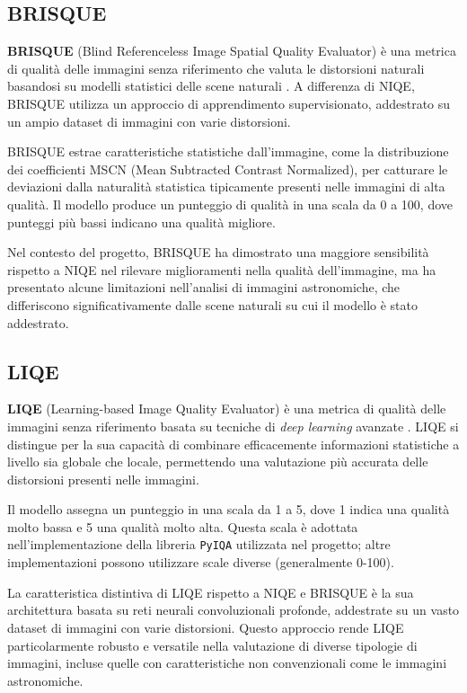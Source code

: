 \subsection{BRISQUE} \label{subsec:brisque}

\textbf{BRISQUE} (Blind Referenceless Image Spatial Quality Evaluator) è una metrica di qualità delle immagini senza riferimento che valuta le distorsioni naturali basandosi su modelli statistici delle scene naturali \cite{brisque}. A differenza di NIQE, BRISQUE utilizza un approccio di apprendimento supervisionato, addestrato su un ampio dataset di immagini con varie distorsioni.

BRISQUE estrae caratteristiche statistiche dall'immagine, come la distribuzione dei coefficienti MSCN (Mean Subtracted Contrast Normalized), per catturare le deviazioni dalla naturalità statistica tipicamente presenti nelle immagini di alta qualità. Il modello produce un punteggio di qualità in una scala da 0 a 100, dove punteggi più bassi indicano una qualità migliore.

Nel contesto del progetto, BRISQUE ha dimostrato una maggiore sensibilità rispetto a NIQE nel rilevare miglioramenti nella qualità dell'immagine, ma ha presentato alcune limitazioni nell'analisi di immagini astronomiche, che differiscono significativamente dalle scene naturali su cui il modello è stato addestrato.

\subsection{LIQE} \label{subsec:liqe}

\textbf{LIQE} (Learning-based Image Quality Evaluator) è una metrica di qualità delle immagini senza riferimento basata su tecniche di \textit{deep learning} avanzate \cite{liqe}. LIQE si distingue per la sua capacità di combinare efficacemente informazioni statistiche a livello sia globale che locale, permettendo una valutazione più accurata delle distorsioni presenti nelle immagini.

Il modello assegna un punteggio in una scala da 1 a 5, dove 1 indica una qualità molto bassa e 5 una qualità molto alta. Questa scala è adottata nell'implementazione della libreria \texttt{PyIQA} utilizzata nel progetto; altre implementazioni possono utilizzare scale diverse (generalmente 0-100).

La caratteristica distintiva di LIQE rispetto a NIQE e BRISQUE è la sua architettura basata su reti neurali convoluzionali profonde, addestrate su un vasto dataset di immagini con varie distorsioni. Questo approccio rende LIQE particolarmente robusto e versatile nella valutazione di diverse tipologie di immagini, incluse quelle con caratteristiche non convenzionali come le immagini astronomiche.

